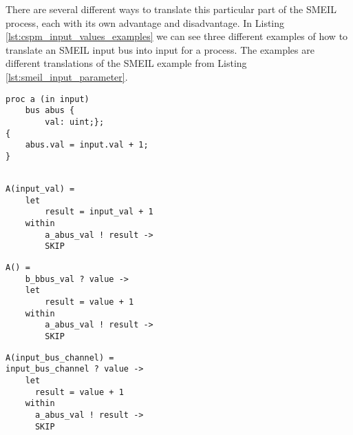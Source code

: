 There are several different ways to translate this particular part of the SMEIL process, each with its own advantage and disadvantage.
In Listing \ref{lst:cspm_input_values_examples} we can see three different examples of how to translate an SMEIL input bus into input for a \cspm{} process. The examples are different translations of the SMEIL example from Listing \ref{lst:smeil_input_parameter}.\\

\begin{minipage}[t]{.98\linewidth}
    \centering
\begin{minipage}[t]{0.45\linewidth}
  \begin{verbatim}
proc a (in input)
    bus abus {
        val: uint;};
{
    abus.val = input.val + 1;
}
  \end{verbatim}
  \label{lst:smeil_input_parameter}
\end{minipage}
\hspace{0.6cm}
\begin{minipage}[t]{0.45\linewidth}
\begin{verbatim}

A(input_val) =
    let
        result = input_val + 1
    within
        a_abus_val ! result ->
        SKIP
\end{verbatim}
\label{lst:cspm_input_value}
\end{minipage}
\hspace{0.6cm}
\vspace{0.5cm}
\newline
\begin{minipage}[t]{0.45\linewidth}
\begin{verbatim}
A() =
    b_bbus_val ? value ->
    let
        result = value + 1
    within
        a_abus_val ! result ->
        SKIP
\end{verbatim}
\label{lst:cspm_no_input}
\end{minipage}
\hspace{0.6cm}
\begin{minipage}[t]{0.45\linewidth}
\begin{verbatim}
A(input_bus_channel) =
input_bus_channel ? value ->
    let
      result = value + 1
    within
      a_abus_val ! result ->
      SKIP
\end{verbatim}
\label{lst:cspm_channel_reads_input}
\end{minipage}
\vspace{0.3cm}
\label{lst:cspm_input_values_examples}
\vspace{1cm}
\end{minipage}

